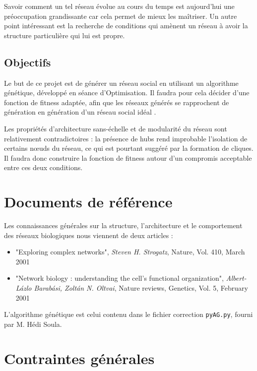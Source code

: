 Savoir comment un tel réseau évolue au cours du temps est aujourd'hui une préoccupation grandissante car cela permet de mieux les maîtriser. Un autre point intéressant est la recherche de conditions qui amènent un réseau à avoir la structure particulière qui lui est propre.

\subsection{Objectifs}
Le but de ce projet est de générer un réseau social en utilisant un algorithme génétique, développé en séance d'Optimisation. Il faudra pour cela décider d'une fonction de fitness adaptée, afin que les réseaux générés se rapprochent de génération en génération d'un réseau social \og idéal \fg .

Les propriétés d'architecture \og sans-échelle \fg{} et de modularité du réseau sont relativement contradictoires : la présence de hubs rend improbable l'isolation de certains n\oe{}uds du réseau, ce qui est pourtant suggéré par la formation de cliques. Il faudra donc construire la fonction de fitness autour d'un compromis acceptable entre ces deux conditions.

\section{Documents de référence}
Les connaissances générales sur la structure, l'architecture et le comportement des réseaux biologiques nous viennent de deux articles :

\begin{itemize}
	\item "Exploring complex networks", \textit{Steven H. Strogatz}, Nature, Vol. 410, March 2001
	\item "Network biology : understanding the cell's functional organization", \textit{Albert-L\'{a}zlo Barab\'{a}si, Zolt\'{a}n N. Oltvai}, Nature reviews, Genetics, Vol. 5, February 2001\medskip
\end{itemize}


L'algorithme génétique est celui contenu dans le fichier correction \texttt{pyAG.py}, fourni par M. Hédi Soula.

\section{Contraintes générales}

